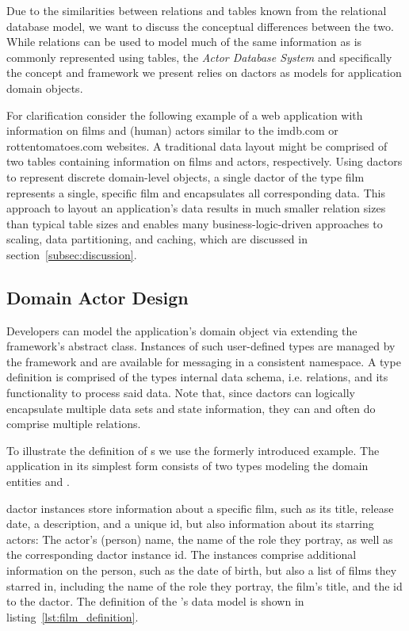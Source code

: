 Due to the similarities between relations and tables known from the relational database model, we want to discuss the conceptual differences between the two.
While relations can be used to model much of the same information as is commonly represented using tables, the \textit{Actor Database System} and specifically the concept and framework we present relies on \glspl{dactor} as models for application domain objects.

For clarification consider the following example of a web application with information on films and (human) actors similar to the imdb.com or rottentomatoes.com websites.
A traditional data layout might be comprised of two tables containing information on films and actors, respectively.
Using \glspl{dactor} to represent discrete domain-level objects, a single \gls{dactor} of the type film represents a single, specific film and encapsulates all corresponding data.
This approach to layout an application's data results in much smaller relation sizes than typical table sizes and enables many business-logic-driven approaches to scaling, data partitioning, and caching, which are discussed in section~\ref{subsec:discussion}.

\subsection{Domain Actor Design}\label{subsec:domain_actor_design}

Developers can model the application's domain object via extending the framework's abstract  class.
Instances of such user-defined  types are managed by the framework and are available for messaging in a consistent namespace.
A  type definition is comprised of the types internal data schema, i.e. relations, and its functionality to process said data.
Note that, since \glspl{dactor} can logically encapsulate multiple data sets and state information, they can and often do comprise multiple relations.

To illustrate the definition of s we use the formerly introduced example.
The application in its simplest form consists of two  types modeling the domain entities  and .

 \gls{dactor} instances store information about a specific film, such as its title, release date, a description, and a unique id, but also information about its starring actors:
The actor's (person) name, the name of the role they portray, as well as the corresponding \gls{dactor} instance id.
The  instances comprise additional information on the person, such as the date of birth, but also a list of films they starred in, including the name of the role they portray, the film's title, and the id to the  \gls{dactor}.
The definition of the 's data model is shown in listing~\ref{lst:film_definition}.

